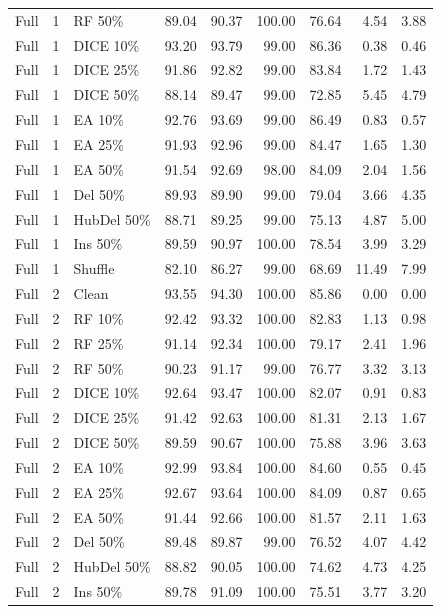 {\begin{longtable}{rllrrrrrr}
Full & 1 & RF 50\% & 89.04 & 90.37 & 100.00 & 76.64 & 4.54 & 3.88 \\
Full & 1 & DICE 10\% & 93.20 & 93.79 & 99.00 & 86.36 & 0.38 & 0.46 \\
Full & 1 & DICE 25\% & 91.86 & 92.82 & 99.00 & 83.84 & 1.72 & 1.43 \\
Full & 1 & DICE 50\% & 88.14 & 89.47 & 99.00 & 72.85 & 5.45 & 4.79 \\
Full & 1 & EA 10\% & 92.76 & 93.69 & 99.00 & 86.49 & 0.83 & 0.57 \\
Full & 1 & EA 25\% & 91.93 & 92.96 & 99.00 & 84.47 & 1.65 & 1.30 \\
Full & 1 & EA 50\% & 91.54 & 92.69 & 98.00 & 84.09 & 2.04 & 1.56 \\
Full & 1 & Del 50\% & 89.93 & 89.90 & 99.00 & 79.04 & 3.66 & 4.35 \\
Full & 1 & HubDel 50\% & 88.71 & 89.25 & 99.00 & 75.13 & 4.87 & 5.00 \\
Full & 1 & Ins 50\% & 89.59 & 90.97 & 100.00 & 78.54 & 3.99 & 3.29 \\
Full & 1 & Shuffle & 82.10 & 86.27 & 99.00 & 68.69 & 11.49 & 7.99 \\
Full & 2 & Clean & 93.55 & 94.30 & 100.00 & 85.86 & 0.00 & 0.00 \\
Full & 2 & RF 10\% & 92.42 & 93.32 & 100.00 & 82.83 & 1.13 & 0.98 \\
Full & 2 & RF 25\% & 91.14 & 92.34 & 100.00 & 79.17 & 2.41 & 1.96 \\
Full & 2 & RF 50\% & 90.23 & 91.17 & 99.00 & 76.77 & 3.32 & 3.13 \\
Full & 2 & DICE 10\% & 92.64 & 93.47 & 100.00 & 82.07 & 0.91 & 0.83 \\
Full & 2 & DICE 25\% & 91.42 & 92.63 & 100.00 & 81.31 & 2.13 & 1.67 \\
Full & 2 & DICE 50\% & 89.59 & 90.67 & 100.00 & 75.88 & 3.96 & 3.63 \\
Full & 2 & EA 10\% & 92.99 & 93.84 & 100.00 & 84.60 & 0.55 & 0.45 \\
Full & 2 & EA 25\% & 92.67 & 93.64 & 100.00 & 84.09 & 0.87 & 0.65 \\
Full & 2 & EA 50\% & 91.44 & 92.66 & 100.00 & 81.57 & 2.11 & 1.63 \\
Full & 2 & Del 50\% & 89.48 & 89.87 & 99.00 & 76.52 & 4.07 & 4.42 \\
Full & 2 & HubDel 50\% & 88.82 & 90.05 & 100.00 & 74.62 & 4.73 & 4.25 \\
Full & 2 & Ins 50\% & 89.78 & 91.09 & 100.00 & 75.51 & 3.77 & 3.20 \\

\end{longtable}}
